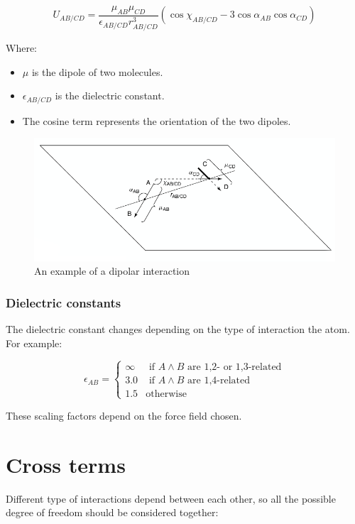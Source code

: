 		$$U_{AB/CD} = \frac{\mu_{AB}\mu_{CD}}{\epsilon_{AB/CD}r^3_{AB/CD}}(\cos\chi_{AB/CD}-3\cos\alpha_{AB}\cos\alpha_{CD})$$

		Where:

		\begin{multicols}{2}
		  \begin{itemize}
		    \item $\mu$ is the dipole of two molecules.
				\item $\epsilon_{AB/CD}$ is the dielectric constant.
				\item The cosine term represents the orientation of the two dipoles.
		  \end{itemize}
		\end{multicols}

		\begin{figure}[H]
			\includegraphics[width=\textwidth]{dipolar-interactions}
			\caption{An example of a dipolar interaction}
			\label{fig:dipolar-interactions}
		\end{figure}

		\subsubsection{Dielectric constants}
		The dielectric constant changes depending on the type of interaction the atom.
		For example:

		$$\epsilon_{AB} = \begin{cases}\infty&\text{ if }A\land B\text{ are 1,2- or 1,3-related}\\3.0&\text{ if }A\land B\text{ are 1,4-related}\\1.5&\text{otherwise}\end{cases}$$

		These scaling factors depend on the force field chosen.

\section{Cross terms}
Different type of interactions depend between each other, so all the possible degree of freedom should be considered together:

